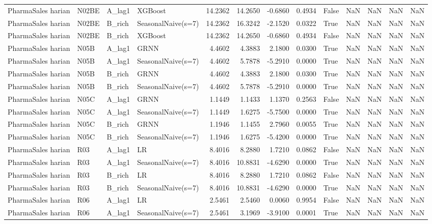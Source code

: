 \begin{table}
\begin{tabular}{llllrrrrllrrl}
PharmaSales harian & N02BE & A\_lag1 & XGBoost & 14.2362 & 14.2650 & -0.6860 & 0.4934 & False & NaN & NaN & NaN & NaN \\
PharmaSales harian & N02BE & B\_rich & SeasonalNaive(s=7) & 14.2362 & 16.3242 & -2.1520 & 0.0322 & True & NaN & NaN & NaN & NaN \\
PharmaSales harian & N02BE & B\_rich & XGBoost & 14.2362 & 14.2650 & -0.6860 & 0.4934 & False & NaN & NaN & NaN & NaN \\
PharmaSales harian & N05B & A\_lag1 & GRNN & 4.4602 & 4.3883 & 2.1800 & 0.0300 & True & NaN & NaN & NaN & NaN \\
PharmaSales harian & N05B & A\_lag1 & SeasonalNaive(s=7) & 4.4602 & 5.7878 & -5.2910 & 0.0000 & True & NaN & NaN & NaN & NaN \\
PharmaSales harian & N05B & B\_rich & GRNN & 4.4602 & 4.3883 & 2.1800 & 0.0300 & True & NaN & NaN & NaN & NaN \\
PharmaSales harian & N05B & B\_rich & SeasonalNaive(s=7) & 4.4602 & 5.7878 & -5.2910 & 0.0000 & True & NaN & NaN & NaN & NaN \\
PharmaSales harian & N05C & A\_lag1 & GRNN & 1.1449 & 1.1433 & 1.1370 & 0.2563 & False & NaN & NaN & NaN & NaN \\
PharmaSales harian & N05C & A\_lag1 & SeasonalNaive(s=7) & 1.1449 & 1.6275 & -5.7500 & 0.0000 & True & NaN & NaN & NaN & NaN \\
PharmaSales harian & N05C & B\_rich & GRNN & 1.1946 & 1.1455 & 2.7960 & 0.0055 & True & NaN & NaN & NaN & NaN \\
PharmaSales harian & N05C & B\_rich & SeasonalNaive(s=7) & 1.1946 & 1.6275 & -5.4200 & 0.0000 & True & NaN & NaN & NaN & NaN \\
PharmaSales harian & R03 & A\_lag1 & LR & 8.4016 & 8.2880 & 1.7210 & 0.0862 & False & NaN & NaN & NaN & NaN \\
PharmaSales harian & R03 & A\_lag1 & SeasonalNaive(s=7) & 8.4016 & 10.8831 & -4.6290 & 0.0000 & True & NaN & NaN & NaN & NaN \\
PharmaSales harian & R03 & B\_rich & LR & 8.4016 & 8.2880 & 1.7210 & 0.0862 & False & NaN & NaN & NaN & NaN \\
PharmaSales harian & R03 & B\_rich & SeasonalNaive(s=7) & 8.4016 & 10.8831 & -4.6290 & 0.0000 & True & NaN & NaN & NaN & NaN \\
PharmaSales harian & R06 & A\_lag1 & LR & 2.5461 & 2.5460 & 0.0060 & 0.9954 & False & NaN & NaN & NaN & NaN \\
PharmaSales harian & R06 & A\_lag1 & SeasonalNaive(s=7) & 2.5461 & 3.1969 & -3.9100 & 0.0001 & True & NaN & NaN & NaN & NaN \\

\end{tabular}
\end{table}
